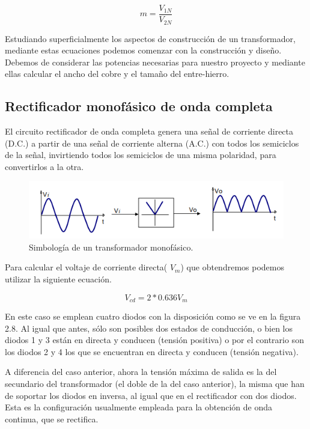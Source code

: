 \begin{equation}\label{eq:ej}
m=\dfrac{V_{1N}}{V_{2N}}
\end{equation}

Estudiando superficialmente los aspectos de construcción de un transformador, mediante estas ecuaciones podemos comenzar con la construcción y diseño. Debemos de considerar las potencias necesarias para nuestro proyecto y mediante ellas calcular el ancho del cobre y el tamaño del entre-hierro.\cite{transformador}

\subsection{Rectificador monofásico de onda completa}

El circuito rectificador de onda completa genera una señal de corriente directa (D.C.) a partir de una señal de corriente alterna
(A.C.) con todos los semiciclos de la señal, invirtiendo todos los semiciclos de una misma polaridad, para convertirlos a la otra. 

\begin{figure}[H]
\centering
\includegraphics[width=12cm]{capitulo3/figs/puente.png}
\caption{ Simbología de un transformador monofásico.}
\end{figure}

Para calcular el voltaje de corriente directa( $V_{m}$) que obtendremos podemos utilizar la siguiente ecuación.\cite{rectificador}


\begin{equation}\label{eq:ej}
V_{cd}=2*0.636V_{m}
\end{equation}

En este caso se emplean cuatro diodos con la disposición como se ve en la figura 2.8. Al igual que antes, sólo son posibles dos estados de conducción, o bien los diodos 1 y 3 están en directa y conducen (tensión positiva) o por el contrario son los diodos 2 y 4 los que se encuentran en directa y conducen (tensión negativa).

A diferencia del caso anterior, ahora la tensión máxima de salida es la del secundario del transformador (el doble de la del caso anterior), la misma que han de soportar los diodos en inversa, al igual que en el rectificador con dos diodos. Esta es la configuración usualmente empleada para la obtención de onda continua, que se rectifica.

